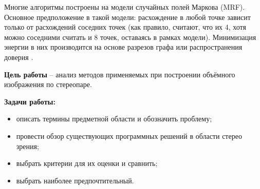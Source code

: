 Многие алгоритмы построены на модели случайных полей Маркова (MRF). Основное предположение в такой модели: расхождение в любой точке зависит только от расхождений соседних точек
(как правило, считают, что их 4, хотя можно соседними считать
и 8 точек, оставаясь в рамках модели). Минимизация энергии в
них производится на основе разрезов графа или распространения
доверия \cite{10}.

\textbf{Цель работы} – анализ методов применяемых при построении объёмного изображения по стереопаре.

\textbf{Задачи работы:}
\begin{itemize}
	\item описать термины предметной области и обозначить проблему;
	\item провести обзор существующих программных решений в области стерео зрения;
	\item выбрать критерии для их оценки и сравнить;
	\item выбрать наиболее предпочтительный.
\end{itemize}
